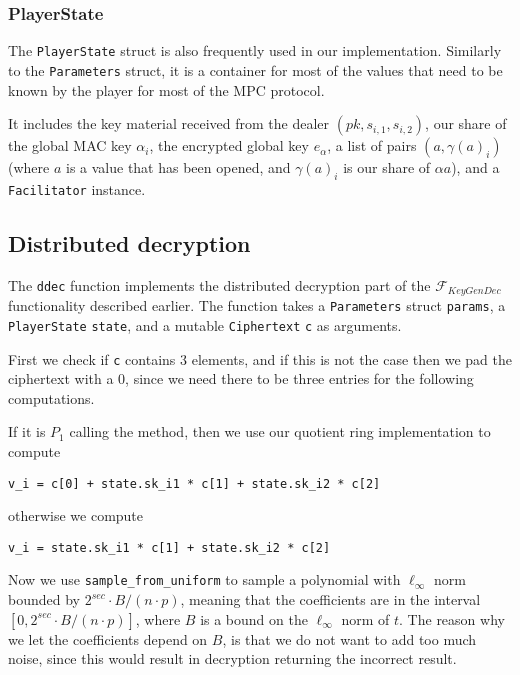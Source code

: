 \documentclass[../main.tex]{subfiles}
\begin{document}
\subsubsection{PlayerState}

The \lstinline{PlayerState} struct is also frequently used in our implementation. Similarly to the \lstinline{Parameters} struct, it is a container for most of the values that need to be known by the player for most of the MPC protocol.

It includes the key material received from the dealer $(pk, s_{i,1}, s_{i,2})$, our share of the global MAC key $\alpha_i$, the encrypted global key $e_\alpha$, a list of pairs $(a, \gamma(a)_i)$ (where $a$ is a value that has been opened, and $\gamma(a)_i$ is our share of $\alpha a$), and a \lstinline{Facilitator} instance.

\subsection{Distributed decryption}
The \lstinline{ddec} function implements the distributed decryption part of the $\mathcal{F}_{KeyGenDec}$ functionality described earlier. The function takes a \lstinline{Parameters} struct \lstinline{params}, a \lstinline{PlayerState} \lstinline{state}, and a mutable \lstinline{Ciphertext} \lstinline{c} as arguments.

First we check if \lstinline{c} contains $3$ elements, and if this is not the case then we pad the ciphertext with a $0$, since we need there to be three entries for the following computations.

If it is $P_1$ calling the method, then we use our quotient ring implementation to compute
\begin{center}
    \lstinline{v_i = c[0] + state.sk_i1 * c[1] + state.sk_i2 * c[2]}
\end{center}
otherwise we compute
\begin{center}
    \lstinline{v_i = state.sk_i1 * c[1] + state.sk_i2 * c[2]}
\end{center}

Now we use \lstinline{sample_from_uniform} to sample a polynomial with $\ell_\infty$ norm bounded by $2^{sec} \cdot B/(n \cdot p)$, meaning that the coefficients are in the interval $[0, 2^{sec} \cdot B/(n \cdot p)]$, where $B$ is a bound on the $\ell_\infty$ norm of $t$.
The reason why we let the coefficients depend on $B$, is that we do not want to add too much noise, since this would result in decryption returning the incorrect result.
\end{document}
